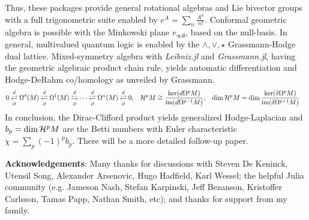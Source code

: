 \documentclass[]{article}
\theoremstyle{definition}
\theoremstyle{remark}
\begin{document}
Thus, these packages provide general rotational algebras and Lie bivector groups with a full trigonometric suite enabled by $ e^{A} = \sum_n \frac{A^n}{n!} $.
Conformal geometric algebra is possible with the Minkowski plane $v_{\infty\emptyset}$, based on the null-basis.
In general, multivalued quantum logic is enabled by the $\wedge,\vee,\star$ Grassmann-Hodge dual lattice.
Mixed-symmetry algebra with \textit{Leibniz.jl} and \textit{Grassmann.jl}, having the geometric algebraic product chain rule, yields automatic differentiation and Hodge-DeRahm co/homology  as unveiled by Grassmann.
\begin{align*}
	0 &\overset{d}{\underset{\partial}{\rightleftarrows}} \Omega^0(M) \overset{d}{\underset{\partial}{\rightleftarrows}} \Omega^1(M) \overset{d}{\underset{\partial}{\leftrightarrows}} \cdots \overset{d}{\underset{\partial}{\rightleftarrows}} \Omega^n(M) \overset{d}{\underset{\partial}{\rightleftarrows}} 0, & \mathcal{H}^pM &\cong \frac{\ker(d\Omega^pM)}{\text{im}(d\Omega^{p-1}M)}, & \dim\mathcal{H}^pM &= \dim\frac{\ker(\delta\Omega^pM)}{\text{im}(\delta\Omega^{p+1}M)}
\end{align*}
In conclusion, the Dirac-Clifford product yields generalized Hodge-Laplacian and $b_p=\dim\mathcal{H}^pM$ are the Betti numbers with Euler characteristic $\chi = \sum_p (-1)^pb_p$.
There will be a more detailed follow-up paper.

\textbf{Acknowledgements}: Many thanks for discussions with Steven De Keninck, Utensil Song, Alexander Arsenovic, Hugo Hadfield, Karl Wessel; the helpful Julia community (e.g. Jameson Nash, Stefan Karpinski, Jeff Bezanson, Kristoffer Carlsson, Tamas Papp, Nathan Smith, etc); and thanks for support from my family.



\end{document}
